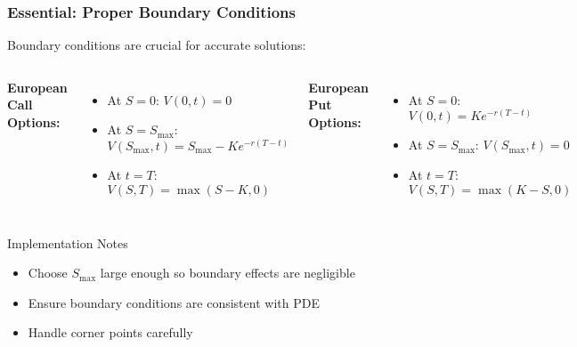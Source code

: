 \documentclass{beamer}
\begin{document}
\begin{frame}
\frametitle{Essential: Proper Boundary Conditions}
Boundary conditions are crucial for accurate solutions:

\begin{columns}
\textbf{European Call Options:}
\begin{itemize}
\item At \(S = 0\): \(V(0,t) = 0\)
\item At \(S = S_{\max}\): \\
\(V(S_{\max},t) = S_{\max} - Ke^{-r(T-t)}\)
\item At \(t = T\): \\
\(V(S,T) = \max(S-K, 0)\)
\end{itemize}

\textbf{European Put Options:}
\begin{itemize}
\item At \(S = 0\): \(V(0,t) = Ke^{-r(T-t)}\)
\item At \(S = S_{\max}\): \(V(S_{\max},t) = 0\)
\item At \(t = T\): \\
\(V(S,T) = \max(K-S, 0)\)
\end{itemize}
\end{columns}

\begin{block}{Implementation Notes}
\begin{itemize}
\item Choose \(S_{\max}\) large enough so boundary effects are negligible
\item Ensure boundary conditions are consistent with PDE
\item Handle corner points carefully
\end{itemize}
\end{block}
\end{frame}
\end{document}
